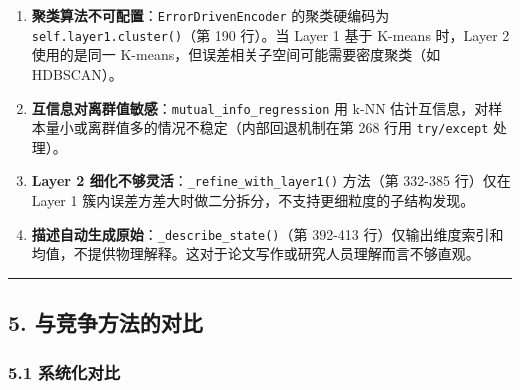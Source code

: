 \documentclass[
  12pt,
]{ctexart}
\begin{document}
\begin{enumerate}
\def\labelenumi{\arabic{enumi}.}
\item
  \textbf{聚类算法不可配置}：\texttt{ErrorDrivenEncoder} 的聚类硬编码为
  \texttt{self.layer1.cluster()}（第 190 行）。当 Layer 1 基于 K-means
  时，Layer 2 使用的是同一 K-means，但误差相关子空间可能需要密度聚类（如
  HDBSCAN）。
\item
  \textbf{互信息对离群值敏感}：\texttt{mutual\_info\_regression} 用 k-NN
  估计互信息，对样本量小或离群值多的情况不稳定（内部回退机制在第 268
  行用 \texttt{try/except} 处理）。
\item
  \textbf{Layer 2 细化不够灵活}：\texttt{\_refine\_with\_layer1()}
  方法（第 332-385 行）仅在 Layer 1
  簇内误差方差大时做二分拆分，不支持更细粒度的子结构发现。
\item
  \textbf{描述自动生成原始}：\texttt{\_describe\_state()}（第 392-413
  行）仅输出维度索引和均值，不提供物理解释。这对于论文写作或研究人员理解而言不够直观。
\end{enumerate}

\begin{center}\rule{0.5\linewidth}{0.5pt}\end{center}

\subsection{5.
与竞争方法的对比}\label{ux4e0eux7adeux4e89ux65b9ux6cd5ux7684ux5bf9ux6bd4}

\subsubsection{5.1 系统化对比}\label{ux7cfbux7edfux5316ux5bf9ux6bd4}
\end{document}
